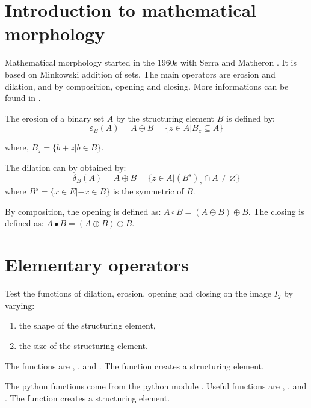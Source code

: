 \vspace*{-14pt}

\section{Introduction to mathematical mor\-pho\-lo\-gy}

Mathematical morphology started in the 1960s with Serra and Mathe\-ron \cite{Serra1982}. It is based on Minkowski addition of sets.  The main operators are erosion and dilation, and by composition, opening and closing. More informations can be found in \cite{Soille2003}.

The erosion of a binary set $A$ by the structuring element $B$ is defined by:
\begin{equation}\varepsilon_B (A)= A \ominus B = \{z\in A | B_{z} \subseteq A\}
\end{equation}

where, $B_z=\{b+z|b\in B\}$.

The dilation can by obtained by:
\begin{equation}\delta_B(A)=A  \oplus B = \{z \in A| (B^{s})_{z} \cap A\neq \varnothing\}\end{equation}
where $B^{s}=\{x\in E | -x \in B\}$ is the symmetric of $B$.

By composition, the opening is defined as:
$A \circ B  = (A \ominus B) \oplus B$.
The closing is defined as:
$A \bullet B  = (A \oplus B) \ominus B $.

\section{Elementary operators}
\begin{qbox}
Test the functions  of dilation, erosion, opening and closing on the image $I_2$ by varying:
\begin{enumerate}
	\item the shape of the structuring element,
	\item the size of the structuring element.
\end{enumerate}
\end{qbox}

\begin{mcomment}
\begin{mremark}
The \matlabregistered{} functions are , ,  and . The func\-tion  creates a structuring element.
\end{mremark}
\end{mcomment}
\begin{pcomment}
\begin{premark}
The python functions come from the python module . Useful func\-tions are , , 
  and
.
 The function  creates a structuring element.
\end{premark}
\end{pcomment}

